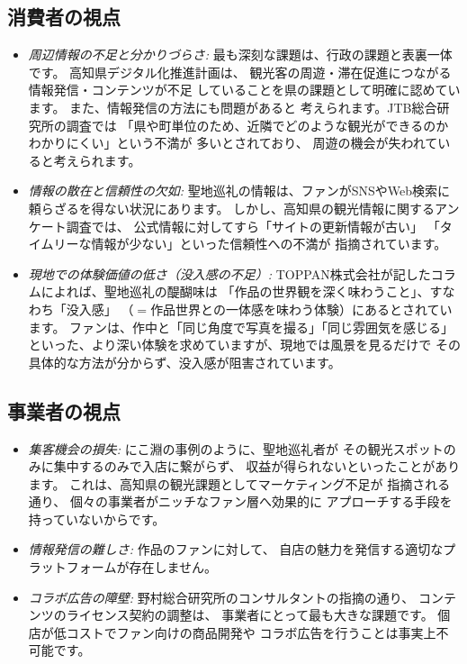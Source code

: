 \documentclass{docs}
\begin{document}
\subsection{消費者の視点}
\begin{itemize}
	\item \emph{周辺情報の不足と分かりづらさ:}
	最も深刻な課題は、行政の課題\cite{kochi_dx_plan}と表裏一体です。
	高知県デジタル化推進計画\cite{kochi_dx_plan}は、
	観光客の周遊・滞在促進につながる情報発信・コンテンツが不足
	していることを県の課題として明確に認めています。
	また、情報発信の方法にも問題があると
	考えられます。JTB総合研究所の調査\cite{jtb_trc_2017}では
	「県や町単位のため、近隣でどのような観光ができるのか
	わかりにくい」という不満が
	多いとされており、
	周遊の機会が失われていると考えられます。

	\item \emph{情報の散在と信頼性の欠如:}
	聖地巡礼の情報は、ファンがSNSやWeb検索に頼らざるを得ない状況にあります。
	しかし、高知県の観光情報に関するアンケート調査では、
	公式情報に対してすら「サイトの更新情報が古い」
	「タイムリーな情報が少ない」といった信頼性への不満が
	指摘されています\cite{kochi_tech_2017}。

	\item \emph{現地での体験価値の低さ（没入感の不足）:}
	TOPPAN株式会社が記したコラム\cite{toppan2025}によれば、聖地巡礼の醍醐味は
	「作品の世界観を深く味わうこと」、すなわち「没入感」
	（$={}$作品世界との一体感を味わう体験）にあるとされています。
	ファンは、作中と「同じ角度で写真を撮る」「同じ雰囲気を感じる」
	といった、より深い体験を求めていますが、現地では風景を見るだけで
	その具体的な方法が分からず、没入感が阻害されています。
\end{itemize}


\subsection{事業者の視点}
\begin{itemize}
	\item \emph{集客機会の損失:}
	にこ淵の事例\cite{nikobuchi_mlit}のように、聖地巡礼者が
	その観光スポットのみに集中するのみで入店に繋がらず、
	収益が得られないといったことがあります。
	これは、高知県の観光課題としてマーケティング不足が
	指摘される通り\cite{kochi_tech_2017}、
	個々の事業者がニッチなファン層へ効果的に
	アプローチする手段を持っていないからです。

	\item \emph{情報発信の難しさ:}
	作品のファンに対して、
	自店の魅力を発信する適切なプラットフォームが存在しません。

	\item \emph{コラボ広告の障壁:}
	野村総合研究所のコンサルタントの指摘\cite{nri2024}の通り、
	コンテンツのライセンス契約の調整は、
	事業者にとって最も大きな課題です。
	個店が低コストでファン向けの商品開発や
	コラボ広告を行うことは事実上不可能です。
\end{itemize}
\end{document}
